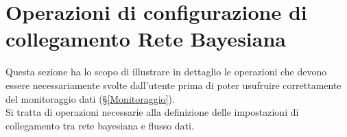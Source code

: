 \section{Operazioni di configurazione di collegamento Rete Bayesiana}\label{PreMonitoraggio}
Questa sezione ha lo scopo di illustrare in dettaglio le operazioni che devono essere necessariamente svolte dall'utente prima di poter usufruire correttamente del monitoraggio dati (§\ref{Monitoraggio}).\\
Si tratta di operazioni necessarie alla definizione delle impostazioni di collegamento tra rete bayesiana e flusso dati.



\pagebreak



\pagebreak



\pagebreak



\pagebreak


